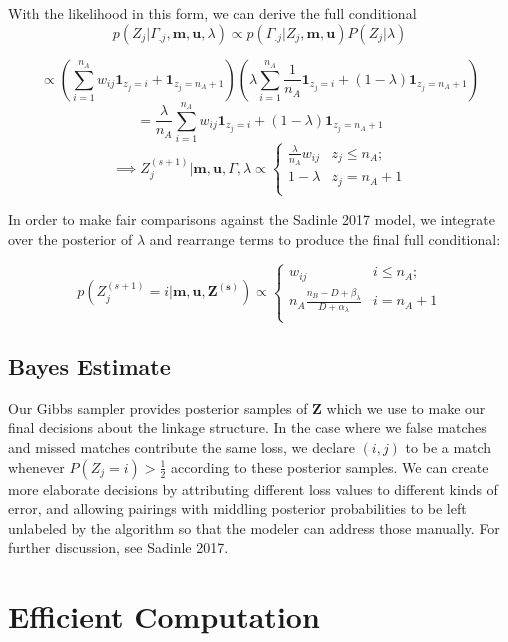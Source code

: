 \documentclass[
  12pt,
]{article}
\begin{document}
With the likelihood in this form, we can derive the full conditional
\[p(Z_j|\Gamma_{.j}, \mathbf{m} ,\mathbf{u}, \lambda) \propto p(\Gamma_{.j}| Z_j, \mathbf{m} ,\mathbf{u}) P(Z_j|\lambda)\]

\[\propto \left(\sum_{i=1}^{n_A}w_{ij}\mathbf{1}_{z_j = i} + \mathbf{1}_{z_j = n_A + 1}\right)\left(\lambda\sum_{i=1}^{n_A}\frac{1}{n_A}\mathbf{1}_{z_j = i} + (1-\lambda)\mathbf{1}_{z_j = n_A + 1}\right)\]
\[= \frac{\lambda}{n_A}\sum_{i=1}^{n_A}w_{ij}\mathbf{1}_{z_j = i} + (1-\lambda)\mathbf{1}_{z_j = n_A + 1} \]
\[ \implies Z_j^{(s+1)} | \mathbf{m}, \mathbf{u}, \Gamma, \lambda \propto
\begin{cases} 
    \frac{\lambda}{n_A}w_{ij}   & z_j \leq n_A; \\
     1-\lambda &  z_j  = n_A + 1 \\
\end{cases}\]

In order to make fair comparisons against the Sadinle 2017 model, we
integrate over the posterior of \(\lambda\) and rearrange terms to
produce the final full conditional:

\[p\left(Z_j^{(s+1)}  = i| \mathbf{m}, \mathbf{u}, \mathbf{Z^{(s)}}\right) \propto
\begin{cases} 
    w_{ij}  & i \leq n_A; \\
     n_A \frac{n_B - D + \beta_{\lambda}}{D + \alpha_{\lambda}} & i  = n_A + 1 \\
\end{cases}\]

\hypertarget{bayes-estimate}{%
\subsection{Bayes Estimate}\label{bayes-estimate}}

Our Gibbs sampler provides posterior samples of \(\mathbf{Z}\) which we
use to make our final decisions about the linkage structure. In the case
where we false matches and missed matches contribute the same loss, we
declare \((i,j)\) to be a match whenever \(P(Z_j = i) > \frac{1}{2}\)
according to these posterior samples. We can create more elaborate
decisions by attributing different loss values to different kinds of
error, and allowing pairings with middling posterior probabilities to be
left unlabeled by the algorithm so that the modeler can address those
manually. For further discussion, see Sadinle 2017.

\hypertarget{efficient-computation}{%
\section{Efficient Computation}\label{efficient-computation}}
\end{document}
